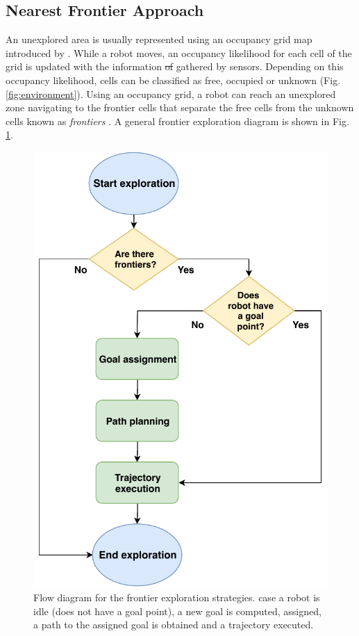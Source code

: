 \subsection{Nearest Frontier Approach} 
An unexplored area is usually represented using an occupancy grid map introduced by \cite{Moravec}. While a robot moves, an occupancy likelihood for each cell of the grid is updated with the information \st{of} {\color{red} gathered by} sensors. Depending on this occupancy likelihood, cells can be classified as free, occupied or unknown (Fig. \ref{fig:environment}). Using an occupancy grid, a robot can reach an unexplored zone navigating to the frontier cells that separate the free cells from the unknown cells known as \textit{frontiers} \cite{Yamauchi1997}. A general frontier exploration diagram is shown in Fig. \ref{fig:flow_diagram}.
\begin{figure}[t!]
	\centering\includegraphics[width=0.85\columnwidth]{./pictures/flow_diagram.pdf}
	\caption{Flow diagram for the frontier exploration strategies. \In case a robot {\color{red}is idle} (does not have a goal point), a new goal is computed, assigned, a path to the assigned goal is obtained and a trajectory executed.}
	\label{fig:flow_diagram}
\end{figure}

